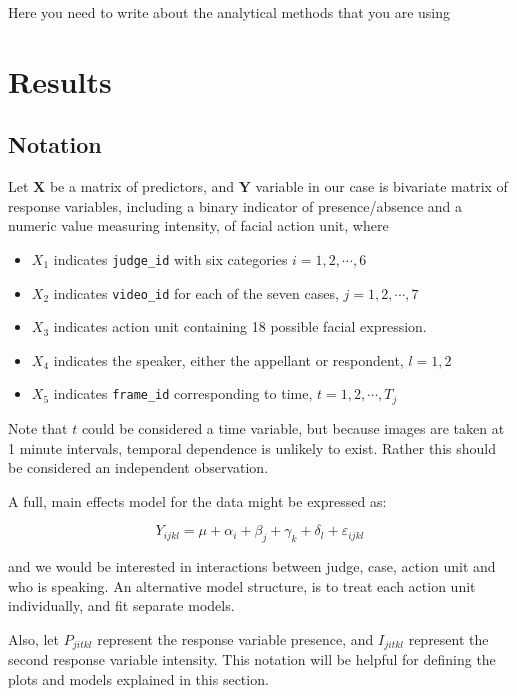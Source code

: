 \documentclass{monashthesis}
\begin{document}
Here you need to write about the analytical methods that you are using

\hypertarget{results}{%
\chapter{Results}\label{results}}

\hypertarget{notation}{%
\section{Notation}\label{notation}}

Let \(\mathbf{X}\) be a matrix of predictors, and \(\mathbf{Y}\) variable in our case is bivariate matrix of response variables, including a binary indicator of presence/absence and a numeric value measuring intensity, of facial action unit, where

\begin{itemize}
\tightlist
\item
  \(X_1\) indicates \texttt{judge\_id} with six categories \(i = 1,2, \cdots, 6\)
\item
  \(X_2\) indicates \texttt{video\_id} for each of the seven cases, \(j = 1,2, \cdots, 7\)
\item
  \(X_3\) indicates action unit containing 18 possible facial expression.\\
\item
  \(X_4\) indicates the speaker, either the appellant or respondent, \(l=1,2\)
\item
  \(X_5\) indicates \texttt{frame\_id} corresponding to time, \(t = 1,2, \cdots, T_j\)
\end{itemize}

Note that \(t\) could be considered a time variable, but because images are taken at 1 minute intervals, temporal dependence is unlikely to exist. Rather this should be considered an independent observation.

A full, main effects model for the data might be expressed as:

\[Y_{ijkl} = \mu + \alpha_i + \beta_j + \gamma_k + \delta_l + \varepsilon_{ijkl}\]

\noindent and we would be interested in interactions between judge, case, action unit and who is speaking. An alternative model structure, is to treat each action unit individually, and fit separate models.

Also, let \(P_{jitkl}\) represent the response variable presence, and \(I_{jitkl}\) represent the second response variable intensity. This notation will be helpful for defining the plots and models explained in this section.
\end{document}
